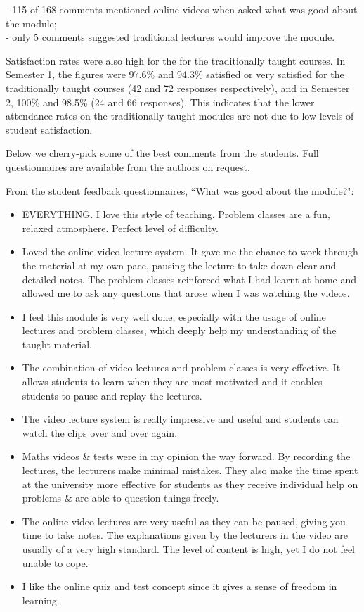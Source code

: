 \documentclass{amsart}
\begin{document}
- 115 of 168 comments mentioned online videos when asked what was good about the module;\\
- only 5 comments suggested traditional lectures would improve the module.

Satisfaction rates were also high for the for the traditionally taught courses.  In Semester 1, the figures were 97.6\% and 94.3\% satisfied or very satisfied for the traditionally taught courses (42 and 72 responses respectively), and in Semester 2, 100\% and 98.5\% (24 and 66 responses).  This indicates that the lower attendance rates on the traditionally taught modules are not due to low levels of student satisfaction.

Below we cherry-pick some of the best comments from the students.  Full questionnaires are available from the authors on request.

From the student feedback questionnaires, ``What was good about the module?":
\begin{itemize}
\item EVERYTHING. I love this style of teaching. Problem classes are a fun, relaxed atmosphere. Perfect level of difficulty.
\item Loved the online video lecture system. It gave me the chance to work through the material at my own pace,
pausing the lecture to take down clear and detailed notes. The problem classes reinforced what I had learnt at
home and allowed me to ask any questions that arose when I was watching the videos.
\item I feel this module is very well done, especially with the usage of online lectures and problem classes, which deeply help my understanding of the taught material.
\item The combination of video lectures and problem classes is very effective. It allows students to learn when they
are most motivated and it enables students to pause and replay the lectures.
\item The video lecture system is really impressive and useful and students can watch the clips over and over again.
\item Maths videos \& tests were in my opinion the way forward. By recording the lectures, the lecturers make minimal
mistakes. They also make the time spent at the university more effective for students as they receive individual
help on problems \& are able to question things freely.
\item The online video lectures are very useful as they can be paused, giving you time to take notes. The explanations
given by the lecturers in the video are usually of a very high standard. The level of content is high, yet I do not
feel unable to cope.
\item I like the online quiz and test concept since it gives a sense of freedom in learning.
\end{itemize}
\end{document}
